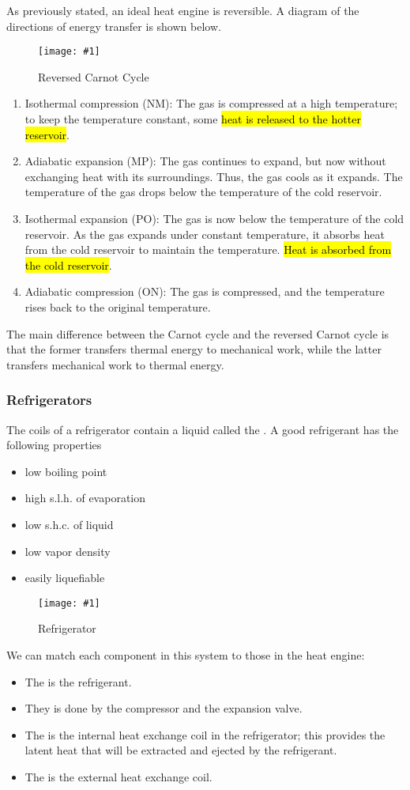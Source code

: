 \documentclass[a4paper,12pt]{article}
\newcommand{\img}[4]{\begin{center}
  \begin{figure}[H]
    \centering
    \texttt{[image: \#1]}
    \caption{#3}
    \label{fig:#4}
  \end{figure}
\end{center}}
\begin{document}
As previously stated, an ideal heat engine is reversible. A diagram of the directions of energy transfer is shown below.

\img{reversecarnot.jpg}{0.7}{Reversed Carnot Cycle}{reversed}

\begin{enumerate}
  \item Isothermal compression (NM): The gas is compressed at a high temperature; to keep the temperature constant, some \hl{heat is released to the hotter reservoir}.
  \item Adiabatic expansion (MP): The gas continues to expand, but now without exchanging heat with its surroundings. Thus, the gas cools as it expands. The temperature of the gas drops below the temperature of the cold reservoir.
  \item Isothermal expansion (PO): The gas is now below the temperature of the cold reservoir. As the gas expands under constant temperature, it absorbs heat from the cold reservoir to maintain the temperature. \hl{Heat is absorbed from the cold reservoir}.
  \item Adiabatic compression (ON): The gas is compressed, and the temperature rises back to the original temperature.
\end{enumerate}

The main difference between the Carnot cycle and the reversed Carnot cycle is that the former transfers thermal energy to mechanical work, while the latter transfers mechanical work to thermal energy.

\subsubsection{Refrigerators}

The coils of a refrigerator contain a liquid called the . A good refrigerant has the following properties
\begin{itemize}
  \item low boiling point
  \item high s.l.h. of evaporation
  \item low s.h.c. of liquid
  \item low vapor density
  \item easily liquefiable
\end{itemize}

\img{refrigerator.png}{0.7}{Refrigerator}{refrigerator}
We can match each component in this system to those in the heat engine:
\begin{itemize}
  \item The  is the refrigerant.
  \item They  is done by the compressor and the expansion valve.
  \item The  is the internal heat exchange coil in the refrigerator; this provides the latent heat that will be extracted and ejected by the refrigerant.
  \item The  is the external heat exchange coil.
\end{itemize}
\end{document}
